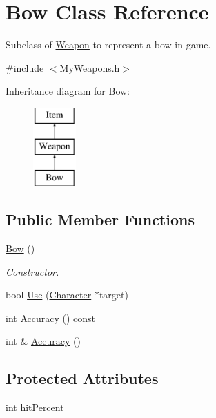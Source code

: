 \hypertarget{classBow}{\section{Bow Class Reference}
\label{classBow}
}


Subclass of \hyperlink{classWeapon}{Weapon} to represent a bow in game.  




{\ttfamily \#include $<$My\-Weapons.\-h$>$}

Inheritance diagram for Bow\-:\begin{figure}[H]
\begin{center}
\leavevmode
\includegraphics[height=3.000000cm]{classBow}
\end{center}
\end{figure}
\subsection*{Public Member Functions}
\begin{DoxyCompactItemize}
\item 
\hyperlink{classBow_ae13f3721e07f62cacca7dc87e7cd3e09}{Bow} ()
\begin{DoxyCompactList}\small\item\em Constructor. \end{DoxyCompactList}\item 
bool \hyperlink{classBow_a07d98049b83e0f21ccbef29c7294bde7}{Use} (\hyperlink{classCharacter}{Character} $\ast$target)
\item 
int \hyperlink{classBow_a21dbb0783c1679385328d55b441c929d}{Accuracy} () const 
\item 
int \& \hyperlink{classBow_a52c352696cee03880097e8b28811e204}{Accuracy} ()
\end{DoxyCompactItemize}
\subsection*{Protected Attributes}
\begin{DoxyCompactItemize}
\item 
int \hyperlink{classBow_ab6156932e51ec7833d07a669e5e346ff}{hit\-Percent}
\end{DoxyCompactItemize}
